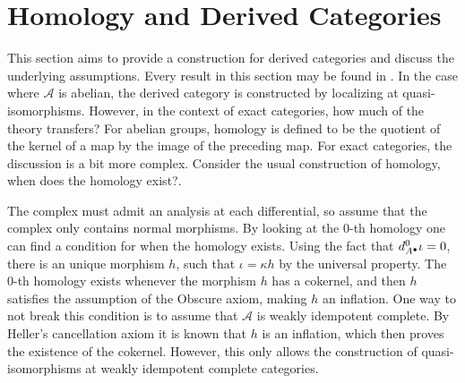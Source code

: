 \section{Homology and Derived Categories}

    This section aims to provide a construction for derived categories and discuss the underlying assumptions. Every result in this section may be found in \cite{buhler}. In the case where $\mathcal{A}$ is abelian, the derived category is constructed by localizing at quasi-isomorphisms. However, in the context of exact categories, how much of the theory transfers? For abelian groups, homology is defined to be the quotient of the kernel of a map by the image of the preceding map. For exact categories, the discussion is a bit more complex. Consider the usual construction of homology, when does the homology exist?.

    \begin{center}
    \end{center}

    The complex must admit an analysis at each differential, so assume that the complex only contains normal morphisms. By looking at the 0-th homology one can find a condition for when the homology exists. Using the fact that $d^0_{A^{\bullet}}\iota = 0$, there is an unique morphism $h$, such that $\iota = \kappa h$ by the universal property. The 0-th homology exists whenever the morphism $h$ has a cokernel, and then $h$ satisfies the assumption of the Obscure axiom, making $h$ an inflation. One way to not break this condition is to assume that $\mathcal{A}$ is weakly idempotent complete. By Heller's cancellation axiom it is known that $h$ is an inflation, which then proves the existence of the cokernel. However, this only allows the construction of quasi-isomorphisms at weakly idempotent complete categories. \\
    
